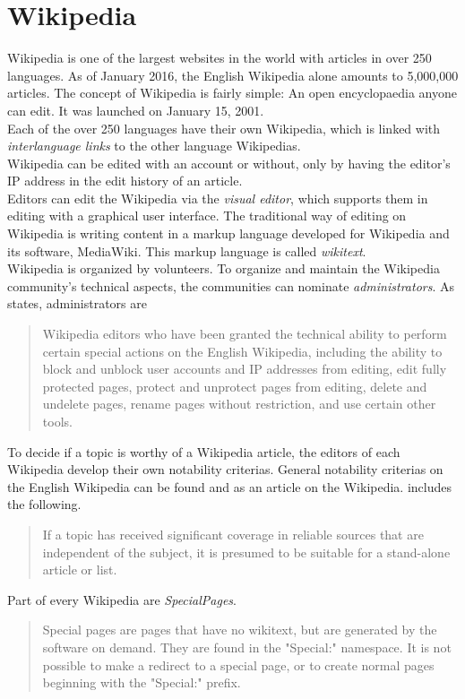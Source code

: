 \section{Wikipedia}
Wikipedia is one of the largest websites in the world with articles in over 250 languages. As of January 2016, the English Wikipedia alone amounts to 5,000,000 articles. 
The concept of Wikipedia is fairly simple: An open encyclopaedia anyone can edit. It was launched on January 15, 2001. \\
Each of the over 250 languages have their own Wikipedia, which is linked with \textit{interlanguage links} to the other language Wikipedias. \\
Wikipedia can be edited with an account or without, only by having the editor's IP address in the edit history of an article. \\
Editors can edit the Wikipedia via the \textit{visual editor}, which supports them in editing with a graphical user interface. The traditional way of editing on Wikipedia is writing content in a markup language developed for Wikipedia and its software, MediaWiki. This markup language is called \textit{wikitext}. \\
Wikipedia is organized by volunteers. To organize and maintain the Wikipedia community's technical aspects, the communities can nominate \textit{administrators}.
As \citet{wiki:10} states, administrators are
\begin{quote}
 Wikipedia editors who have been granted the technical ability to perform certain special actions on the English Wikipedia, including the ability to block and unblock user accounts and IP addresses from editing, edit fully protected pages, protect and unprotect pages from editing, delete and undelete pages, rename pages without restriction, and use certain other tools.
\end{quote}

To decide if a topic is worthy of a Wikipedia article, the editors of each Wikipedia develop their own notability criterias. General notability criterias on the English Wikipedia can be found and as an article on the Wikipedia. \citet{wiki:11} includes the following. 
\begin{quote}
 If a topic has received significant coverage in reliable sources that are independent of the subject, it is presumed to be suitable for a stand-alone article or list.
\end{quote}

Part of every Wikipedia are \textit{SpecialPages}.
\begin{quote}
 Special pages are pages that have no wikitext, but are generated by the software on demand. They are found in the "Special:" namespace. It is not possible to make a redirect to a special page, or to create normal pages beginning with the "Special:" prefix.
\end{quote} \citep{wiki:12}


